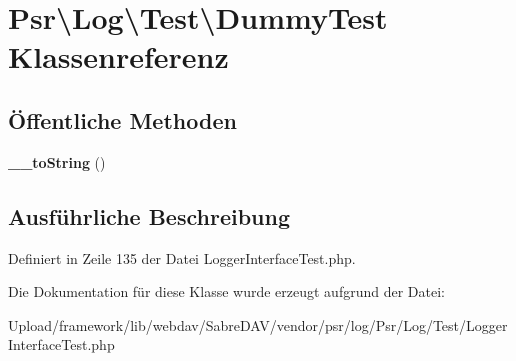 \hypertarget{class_psr_1_1_log_1_1_test_1_1_dummy_test}{}\section{Psr\textbackslash{}Log\textbackslash{}Test\textbackslash{}Dummy\+Test Klassenreferenz}
\label{class_psr_1_1_log_1_1_test_1_1_dummy_test}
\subsection*{Öffentliche Methoden}
\begin{DoxyCompactItemize}
\item 
\mbox{\label{class_psr_1_1_log_1_1_test_1_1_dummy_test_a08a26ddd13ea4fa022564ee7979f4986}} 
{\bfseries \+\_\+\+\_\+to\+String} ()
\end{DoxyCompactItemize}


\subsection{Ausführliche Beschreibung}


Definiert in Zeile 135 der Datei Logger\+Interface\+Test.\+php.



Die Dokumentation für diese Klasse wurde erzeugt aufgrund der Datei\+:\begin{DoxyCompactItemize}
\item 
Upload/framework/lib/webdav/\+Sabre\+D\+A\+V/vendor/psr/log/\+Psr/\+Log/\+Test/Logger\+Interface\+Test.\+php\end{DoxyCompactItemize}
